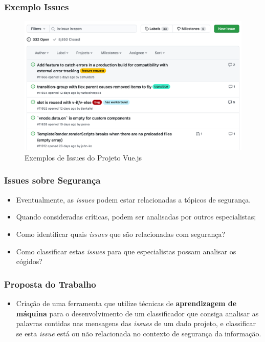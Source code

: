 \begin{frame}
  \frametitle{Exemplo Issues}
  \begin{figure}[htbp]
    \includegraphics[width=\textwidth]{images/issues_example.png}
    \caption{Exemplos de Issues do Projeto Vue.js}
  \end{figure}
\end{frame}

\begin{frame}
  \frametitle{Issues sobre Segurança}
  \begin{itemize}
    \item Eventualmente, as \textit{issues} podem estar relacionadas a tópicos de segurança.
    \item Quando consideradas críticas, podem ser analisadas por outros especialistas;
    \item Como identificar quais \textit{issues} que são relacionadas com segurança?
    \item Como classificar estas \textit{issues} para que especialistas possam analisar os cógidos?
  \end{itemize}
\end{frame}

\begin{frame}
  \frametitle{Proposta do Trabalho}
  \begin{itemize}
    \item Criação de uma ferramenta que utilize técnicas de \textbf{aprendizagem de máquina} para o desenvolvimento de um classificador que consiga analisar as palavras contidas nas mensagens das \textit{issues} de um dado projeto, e classificar se esta \textit{issue} está ou não relacionada no contexto de segurança da informação.
  \end{itemize}
\end{frame}